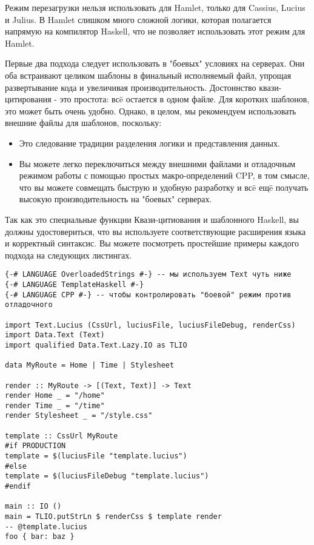 \begin{remark}
    Режим перезагрузки нельзя использовать для Hamlet, только для Cassius,
    Lucius и Julius.  В Hamlet слишком много сложной логики, которая полагается
    напрямую на компилятор Haskell, что не позволяет использовать этот режим
    для Hamlet.
\end{remark}


Первые два подхода следует использовать в "боевых" условиях на серверах.  Они
оба встраивают целиком шаблоны в финальный исполняемый файл, упрощая
развертывание кода и увеличивая производительность.  Достоинство
квази-цитирования - это простота: всë остается в одном файле.  Для коротких
шаблонов, это может быть очень удобно. Однако, в целом, мы рекомендуем
использовать внешние файлы для шаблонов, поскольку:

\begin{itemize}
    \item Это следование традиции разделения логики и представления данных.
    \item Вы можете легко переключиться между внешними файлами и отладочным
        режимом работы с помощью простых макро-определений CPP, в том
        смысле, что вы можете совмещать быструю и удобную разработку и всë ещë
        получать высокую производительность на "боевых" серверах.
\end{itemize}

Так как это специальные функции Квази-цитиования и шаблонного Haskell,
вы должны удостовериться, что вы используете соответствующие расширения языка и
корректный синтаксис. Вы можете посмотреть простейшие примеры каждого подхода
на следующих листингах.


\begin{lstlisting}[caption=Внешние файлы]
{-# LANGUAGE OverloadedStrings #-} -- мы используем Text чуть ниже
{-# LANGUAGE TemplateHaskell #-}
{-# LANGUAGE CPP #-} -- чтобы контролировать "боевой" режим против отладочного

import Text.Lucius (CssUrl, luciusFile, luciusFileDebug, renderCss)
import Data.Text (Text)
import qualified Data.Text.Lazy.IO as TLIO

data MyRoute = Home | Time | Stylesheet

render :: MyRoute -> [(Text, Text)] -> Text
render Home _ = "/home"
render Time _ = "/time"
render Stylesheet _ = "/style.css"

template :: CssUrl MyRoute
#if PRODUCTION
template = $(luciusFile "template.lucius")
#else
template = $(luciusFileDebug "template.lucius")
#endif

main :: IO ()
main = TLIO.putStrLn $ renderCss $ template render
-- @template.lucius
foo { bar: baz }
\end{lstlisting}

